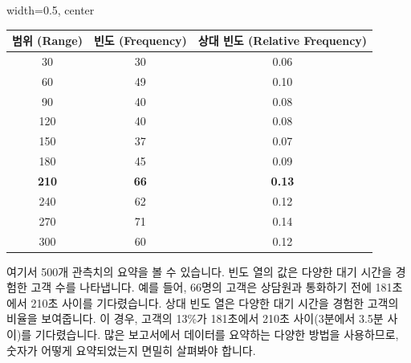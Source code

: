 \documentclass[11pt,a4paper]{article}
\theoremstyle{definition}
\begin{document}
\begin{tcolorbox}[title={양적 데이터에 대한 빈도표 (Frequency Table for Quantitative Data)}]
\begin{center}
\label{tab:quantitative_frequency_table}
\begin{adjustbox}{width=0.5\textwidth, center}
\begin{tabular}{ccc}
\toprule
\textbf{범위 (Range)} & \textbf{빈도 (Frequency)} & \textbf{상대 빈도 (Relative Frequency)} \\
\midrule
30 & 30 & 0.06 \\
60 & 49 & 0.10 \\
90 & 40 & 0.08 \\
120 & 40 & 0.08 \\
150 & 37 & 0.07 \\
180 & 45 & 0.09 \\
\textbf{210} & \textbf{66} & \textbf{0.13} \\ %
240 & 62 & 0.12 \\
270 & 71 & 0.14 \\
300 & 60 & 0.12 \\
\bottomrule
\end{tabular}
\end{adjustbox}
\end{center}
여기서 500개 관측치의 요약을 볼 수 있습니다. 빈도 열의 값은 다양한 대기 시간을 경험한 고객 수를 나타냅니다. 예를 들어, 66명의 고객은 상담원과 통화하기 전에 181초에서 210초 사이를 기다렸습니다. 상대 빈도 열은 다양한 대기 시간을 경험한 고객의 비율을 보여줍니다. 이 경우, 고객의 13\%가 181초에서 210초 사이(3분에서 3.5분 사이)를 기다렸습니다. 많은 보고서에서 데이터를 요약하는 다양한 방법을 사용하므로, 숫자가 어떻게 요약되었는지 면밀히 살펴봐야 합니다.
\end{tcolorbox}
\end{document}
